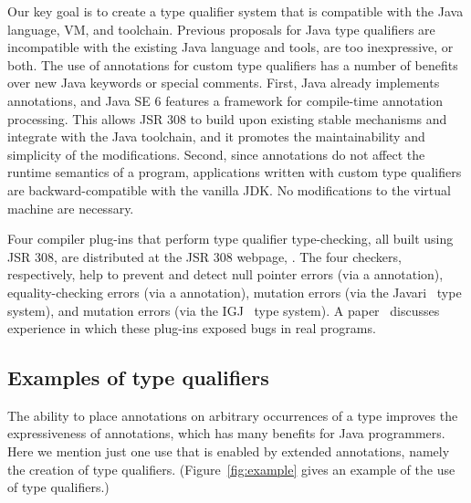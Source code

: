 \documentclass[10pt]{article}
\begin{document}
Our key goal is to create a type qualifier system that is compatible with
the Java language, VM, and toolchain.
Previous proposals
for Java type qualifiers are incompatible with the existing Java language
and tools, are too inexpressive, or both.
The use of annotations for custom type qualifiers has a number of
benefits over new Java keywords or special comments. First, Java
already implements annotations, and Java SE 6 features a framework
for compile-time annotation processing. This allows JSR 308 to
build upon existing stable mechanisms and integrate with the Java
toolchain, and it promotes the maintainability and simplicity of the
modifications. Second, since annotations do not affect the runtime
semantics of a program, applications written with custom type
qualifiers are backward-compatible with the vanilla JDK\@.
No modifications to the virtual machine are necessary.

Four compiler plug-ins that perform type qualifier type-checking, all built
using JSR 308, are distributed at the JSR 308 webpage,
.  The four checkers, respectively,
help to prevent and detect null pointer errors (via a 
annotation), equality-checking errors (via a  annotation),
mutation errors (via the Javari~\cite{BirkaE2004,TschantzE2005} type
system), and mutation errors (via the IGJ~\cite{ZibinPAKE2007} type
system).  A paper~\cite{PapiACPE2008} discusses experience
in which these plug-ins exposed bugs in real programs.


\subsection{Examples of type qualifiers\label{type-qualifier-examples}}

The ability to place annotations on arbitrary occurrences of a type
improves the expressiveness of annotations, which has many benefits for
Java programmers.  Here we mention just one use that is enabled by extended
annotations, namely the creation of type qualifiers.
(Figure~\ref{fig:example} gives an example of the use of type qualifiers.)
\end{document}
